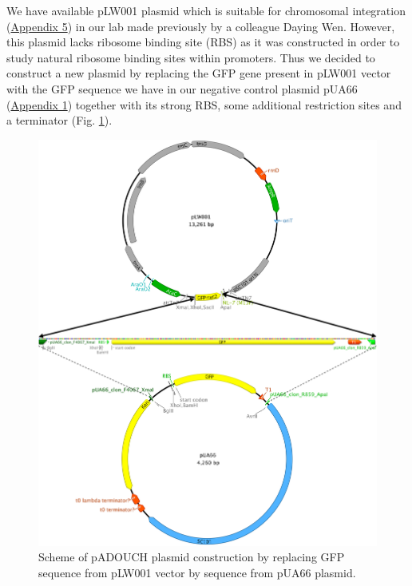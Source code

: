 We have available pLW001 plasmid which is suitable for chromosomal integration (\hyperlink{pLW001}{Appendix 5}) in our lab made previously by a colleague Daying Wen.
However, this plasmid lacks ribosome binding site (RBS) as it was constructed in order to study natural ribosome binding sites within promoters.
Thus we decided to construct a new plasmid by replacing the GFP gene present in pLW001 vector with the GFP sequence we have in our negative control plasmid pUA66 (\hyperlink{pUA66seq}{Appendix 1}) together with its strong RBS, some additional restriction sites and a terminator (Fig. \ref{cloning}).
\begin{figure}[h!]
  \centering
  \includegraphics[scale=0.4]{text/Pictures/Cloning.png}
	\caption{Scheme of pADOUCH plasmid construction by replacing GFP sequence from pLW001 vector by sequence from pUA66 plasmid.}
	\label{cloning}
\end{figure}

